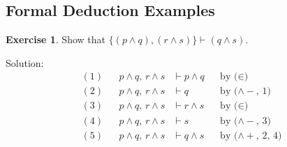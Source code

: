 \documentclass[11pt]{article}
\theoremstyle{definition}
\newtheorem{exercise}[thm]{Exercise}
\begin{document}







\subsection{Formal Deduction Examples}

\begin{exercise}
Show that $\{(p \wedge q), (r \wedge s)\} \vdash (q \wedge s)$.

Solution:
\begin{align*}
    (1) & & p \wedge q,\, r \wedge s &\vdash p \wedge q & & \text{by ($\in$)} \\
    (2) & & p \wedge q,\, r \wedge s &\vdash q & & \text{by ($\wedge-$, 1)} \\
    (3) & & p \wedge q,\, r \wedge s &\vdash r \wedge s & & \text{by ($\in$)} \\
    (4) & & p \wedge q,\, r \wedge s &\vdash s & & \text{by ($\wedge-$, 3)} \\
    (5) & & p \wedge q,\, r \wedge s &\vdash q \wedge s & & \text{by ($\wedge+$, 2, 4)}
\end{align*}
\end{exercise}
\end{document}
